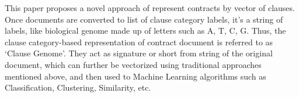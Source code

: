 \documentclass[9pt,academicons]{article}
\begin{document}
This paper proposes a novel approach of represent contracts by vector of clauses.
Once documents are converted to list of clause category labels, it's a string of labels, like biological genome made up of letters such as A, T, C, G. Thus, the clause category-based representation of contract document is referred to as `Clause Genome'.  They act as signature or short from string of the original document, which can further be vectorized using traditional approaches mentioned above, and then used to Machine Learning algorithms such as Classification, Clustering, Similarity, etc.






\end{document}
